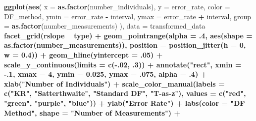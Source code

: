 \documentclass[12pt, twoside]{amherstthesis}
\newenvironment{Shaded}{\begin{snugshade}}{\end{snugshade}}
\newcommand{\DataTypeTok}[1]{\textcolor[rgb]{0.13,0.29,0.53}{#1}}
\newcommand{\DecValTok}[1]{\textcolor[rgb]{0.00,0.00,0.81}{#1}}
\newcommand{\FloatTok}[1]{\textcolor[rgb]{0.00,0.00,0.81}{#1}}
\newcommand{\KeywordTok}[1]{\textcolor[rgb]{0.13,0.29,0.53}{\textbf{#1}}}
\newcommand{\NormalTok}[1]{#1}
\newcommand{\OperatorTok}[1]{\textcolor[rgb]{0.81,0.36,0.00}{\textbf{#1}}}
\newcommand{\StringTok}[1]{\textcolor[rgb]{0.31,0.60,0.02}{#1}}
\begin{document}
\begin{Shaded}
\begin{Highlighting}[]
{{{{{{{{{{{\KeywordTok{ggplot}\NormalTok{(}\KeywordTok{aes}\NormalTok{(}
  \DataTypeTok{x =} \KeywordTok{as.factor}\NormalTok{(number_individuals), }\DataTypeTok{y =}\NormalTok{ error_rate, }\DataTypeTok{color =}\NormalTok{ DF_method,}
  \DataTypeTok{ymin =}\NormalTok{ error_rate }\OperatorTok{-}\StringTok{ }\NormalTok{interval, }\DataTypeTok{ymax =}\NormalTok{ error_rate }\OperatorTok{+}\StringTok{ }\NormalTok{interval,}
  \DataTypeTok{group =} \KeywordTok{as.factor}\NormalTok{(number_measurements)}
\NormalTok{), }\DataTypeTok{data =}\NormalTok{ transformed_data }\OperatorTok{%>%}\StringTok{ }\KeywordTok{filter}\NormalTok{(distribution }\OperatorTok{==}\StringTok{ "Lognormal"}\NormalTok{)) }\OperatorTok{+}
\StringTok{  }\KeywordTok{facet_grid}\NormalTok{(rslope }\OperatorTok{~}\StringTok{ }\NormalTok{type) }\OperatorTok{+}
\StringTok{  }\KeywordTok{geom_pointrange}\NormalTok{(}\DataTypeTok{alpha =} \FloatTok{.4}\NormalTok{, }\KeywordTok{aes}\NormalTok{(}\DataTypeTok{shape =} \KeywordTok{as.factor}\NormalTok{(number_measurements)), }
                  \DataTypeTok{position =} \KeywordTok{position_jitter}\NormalTok{(}\DataTypeTok{h =} \DecValTok{0}\NormalTok{, }\DataTypeTok{w =} \FloatTok{0.4}\NormalTok{)) }\OperatorTok{+}
\StringTok{  }\KeywordTok{geom_hline}\NormalTok{(}\DataTypeTok{yintercept =} \FloatTok{.05}\NormalTok{) }\OperatorTok{+}
\StringTok{  }\KeywordTok{scale_y_continuous}\NormalTok{(}\DataTypeTok{limits =} \KeywordTok{c}\NormalTok{(}\OperatorTok{-}\NormalTok{.}\DecValTok{02}\NormalTok{, }\FloatTok{.3}\NormalTok{)) }\OperatorTok{+}
\StringTok{  }\KeywordTok{annotate}\NormalTok{(}\StringTok{"rect"}\NormalTok{, }\DataTypeTok{xmin =} \FloatTok{-.1}\NormalTok{, }\DataTypeTok{xmax =} \DecValTok{4}\NormalTok{, }\DataTypeTok{ymin =} \FloatTok{0.025}\NormalTok{, }\DataTypeTok{ymax =} \FloatTok{.075}\NormalTok{, }
           \DataTypeTok{alpha =} \FloatTok{.4}\NormalTok{) }\OperatorTok{+}
\StringTok{  }\KeywordTok{xlab}\NormalTok{(}\StringTok{"Number of Individuals"}\NormalTok{) }\OperatorTok{+}
\StringTok{  }\KeywordTok{scale_color_manual}\NormalTok{(}\DataTypeTok{labels =} \KeywordTok{c}\NormalTok{(}\StringTok{"KR"}\NormalTok{, }\StringTok{"Satterthwaite"}\NormalTok{, }\StringTok{"Standard DF"}\NormalTok{, }\StringTok{"T-as-z"}\NormalTok{), }
                     \DataTypeTok{values =} \KeywordTok{c}\NormalTok{(}\StringTok{"red"}\NormalTok{, }\StringTok{"green"}\NormalTok{, }\StringTok{"purple"}\NormalTok{, }\StringTok{"blue"}\NormalTok{)) }\OperatorTok{+}
\StringTok{  }\KeywordTok{ylab}\NormalTok{(}\StringTok{"Error Rate"}\NormalTok{) }\OperatorTok{+}
\StringTok{  }\KeywordTok{labs}\NormalTok{(}\DataTypeTok{color =} \StringTok{"DF Method"}\NormalTok{, }\DataTypeTok{shape =} \StringTok{"Number of Measurements"}\NormalTok{) }\OperatorTok{+}
}}}}}}}}}}}}
\end{Highlighting}
\end{Shaded}
\end{document}
